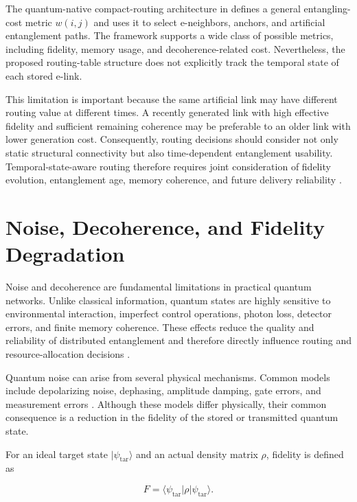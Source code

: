 The quantum-native compact-routing architecture in \cite{caleffi2025quantumarchitecture} defines a general entangling-cost metric $w(i,j)$ and uses it to select e-neighbors, anchors, and artificial entanglement paths. The framework supports a wide class of possible metrics, including fidelity, memory usage, and decoherence-related cost. Nevertheless, the proposed routing-table structure does not explicitly track the temporal state of each stored e-link.

This limitation is important because the same artificial link may have different routing value at different times. A recently generated link with high effective fidelity and sufficient remaining coherence may be preferable to an older link with lower generation cost. Consequently, routing decisions should consider not only static structural connectivity but also time-dependent entanglement usability. Temporal-state-aware routing therefore requires joint consideration of fidelity evolution, entanglement age, memory coherence, and future delivery reliability \cite{ercetin2026fidelityage,ceran2026age,park2025quantum,zheng2024decoherence}.
\section{Noise, Decoherence, and Fidelity Degradation}

Noise and decoherence are fundamental limitations in practical quantum networks. Unlike classical information, quantum states are highly sensitive to environmental interaction, imperfect control operations, photon loss, detector errors, and finite memory coherence. These effects reduce the quality and reliability of distributed entanglement and therefore directly influence routing and resource-allocation decisions \cite{briegel1998quantum,wehner2018vision}.

Quantum noise can arise from several physical mechanisms. Common models include depolarizing noise, dephasing, amplitude damping, gate errors, and measurement errors \cite{pirandola2020advances,vanmeter2014quantum}. Although these models differ physically, their common consequence is a reduction in the fidelity of the stored or transmitted quantum state.

For an ideal target state $|\psi_{\mathrm{tar}}\rangle$ and an actual density matrix $\rho$, fidelity is defined as

\begin{equation}
    F =
    \langle
    \psi_{\mathrm{tar}}
    |
    \rho
    |
    \psi_{\mathrm{tar}}
    \rangle.
\end{equation}


